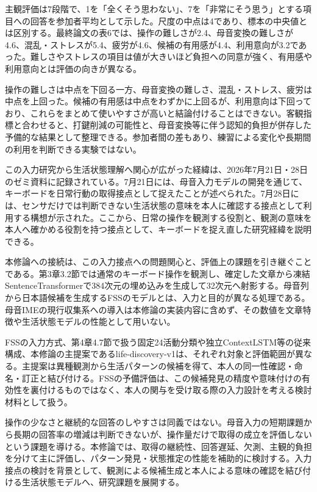 主観評価は7段階で、1を「全くそう思わない」、7を「非常にそう思う」とする項目への回答を参加者平均として示した。尺度の中点は4であり、標本の中央値とは区別する。最終論文の表6では、操作の難しさが2.4、母音変換の難しさが4.6、混乱・ストレスが5.4、疲労が4.6、候補の有用感が4.4、利用意向が3.2であった。難しさやストレスの項目は値が大きいほど負担への同意が強く、有用感や利用意向とは評価の向きが異なる。

操作の難しさは中点を下回る一方、母音変換の難しさ、混乱・ストレス、疲労は中点を上回った。候補の有用感は中点をわずかに上回るが、利用意向は下回っており、これらをまとめて使いやすさが高いと結論付けることはできない。客観指標と合わせると、打鍵削減の可能性と、母音変換等に伴う認知的負担が併存した予備的な結果として整理できる。参加者間の差もあり、練習による変化や長期間の利用を判断できる実験ではない。

この入力研究から生活状態理解へ関心が広がった経緯は、2026年7月21日・28日のゼミ資料に記録されている。7月21日には、母音入力モデルの開発を通じて、キーボードを日常行動の取得接点として捉えたことが述べられた。7月28日には、センサだけでは判断できない生活状態の意味を本人に確認する接点として利用する構想が示された。ここから、日常の操作を観測する役割と、観測の意味を本人へ確かめる役割を持つ接点として、キーボードを捉え直した研究経緯を説明できる。

本修論への接続は、この入力接点への問題関心と、評価上の課題を引き継ぐことである。第3章3.2節では通常のキーボード操作を観測し、確定した文章から凍結SentenceTransformerで384次元の埋め込みを生成して32次元へ射影する。母音列から日本語候補を生成するFSSのモデルとは、入力と目的が異なる処理である。母音IMEの現行収集系への導入は本修論の実装内容に含めず、その数値を文章特徴や生活状態モデルの性能として用いない。

FSSの入力方式、第4章4.7節で扱う固定24活動分類や独立ContextLSTM等の従来構成、本修論の主提案であるlife-discovery-v1は、それぞれ対象と評価範囲が異なる。主提案は異種観測から生活パターンの候補を得て、本人の同一性確認・命名・訂正と結び付ける。FSSの予備評価は、この候補発見の精度や意味付けの有効性を裏付けるものではなく、本人の関与を受け取る際の入力設計を考える検討材料として扱う。

操作の少なさと継続的な回答のしやすさは同義ではない。母音入力の短期課題から長期の回答率の増減は判断できないが、操作量だけで取得の成立を評価しないという課題を導ける。本修論では、取得の継続性、回答遅延、欠測、主観的負担を分けて主に評価し、パターン発見・状態推定の性能を補助的に検討する。入力接点の検討を背景として、観測による候補生成と本人による意味の確認を結び付ける生活状態モデルへ、研究課題を展開する。

